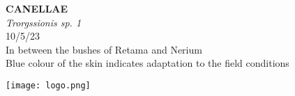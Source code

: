 \documentclass[
  landscape]{article}
\begin{document}
\begin{mdframed}[linecolor=mycolortext, linewidth=2pt, backgroundcolor=mycolor]

  \bigskip
  \begin{flushright}
  \begin{minipage}[t][-50ex][t]{16em}  
  \end{minipage}
  \end{flushright}
  \bigskip
  \begin{adjustwidth}{1cm}{1cm}
  {\fontsize{50pt}{0pt}\selectfont\bf\textcolor{mycolortext}{ CANELLAE }} \\
  \linebreak
  \linebreak
  {\fontsize{40pt}{100pt}\selectfont\textcolor{mycolortext}{\emph{ Trorgssionis sp. 1 }}} \\
  \vfill
  {\fontsize{30pt}{100pt}\selectfont\textcolor{mycolortext}{ 10/5/23 }} \\
  \vfill
  {\fontsize{30pt}{100pt}\selectfont\textcolor{mycolortext}{ In between the bushes of Retama and Nerium }} \\
  \vfill
  {\fontsize{30pt}{50pt}\selectfont\textcolor{mycolortext}{ Blue colour of the skin indicates adaptation to the field conditions }} \\
  \end{adjustwidth}
  \begin{center}
  \texttt{[image: logo.png]}
  \end{center}
  \end{mdframed}
  \pagebreak

\end{document}
